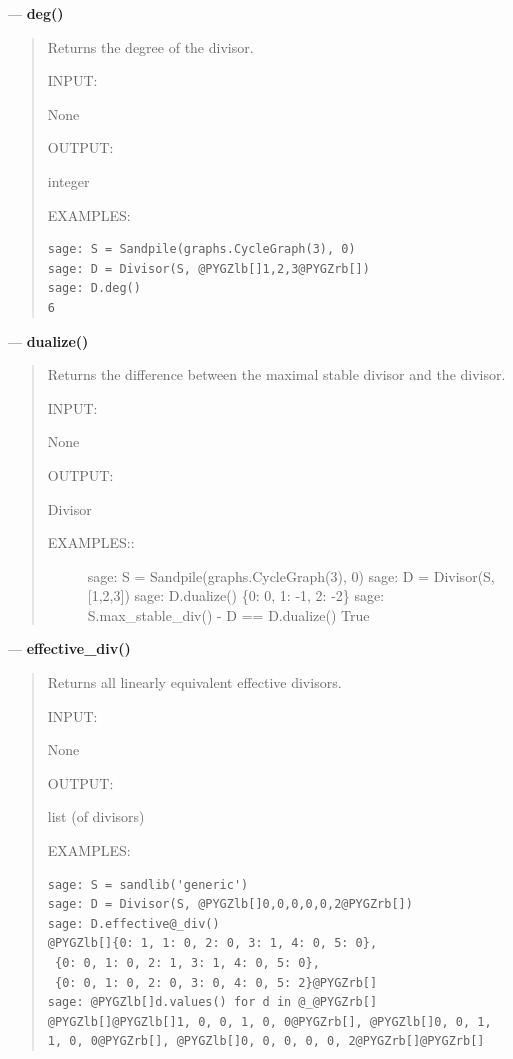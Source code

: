 \documentclass[letterpaper,10pt,english]{manual}
\begin{document}
---
\hypertarget{deg-divisor}{}
\textbf{deg()}
\begin{quote}

Returns the degree of the divisor.

INPUT:

None

OUTPUT:

integer

EXAMPLES:

\begin{Verbatim}[commandchars=@\[\]]
sage: S = Sandpile(graphs.CycleGraph(3), 0)
sage: D = Divisor(S, @PYGZlb[]1,2,3@PYGZrb[])
sage: D.deg()
6
\end{Verbatim}
\end{quote}

---
\hypertarget{dualize-divisor}{}
\textbf{dualize()}
\begin{quote}

Returns the difference between the maximal stable divisor and the
divisor.

INPUT:

None

OUTPUT:

Divisor
\begin{description}
\item[EXAMPLES::]
sage: S = Sandpile(graphs.CycleGraph(3), 0)
sage: D = Divisor(S, {[}1,2,3{]})
sage: D.dualize()
\{0: 0, 1: -1, 2: -2\}
sage: S.max\_stable\_div() - D == D.dualize()
True

\end{description}
\end{quote}

---
\hypertarget{effective-div}{}
\textbf{effective\_div()}
\begin{quote}

Returns all linearly equivalent effective divisors.

INPUT:

None

OUTPUT:

list (of divisors)

EXAMPLES:

\begin{Verbatim}[commandchars=@\[\]]
sage: S = sandlib('generic')
sage: D = Divisor(S, @PYGZlb[]0,0,0,0,0,2@PYGZrb[])
sage: D.effective@_div()
@PYGZlb[]{0: 1, 1: 0, 2: 0, 3: 1, 4: 0, 5: 0},
 {0: 0, 1: 0, 2: 1, 3: 1, 4: 0, 5: 0},
 {0: 0, 1: 0, 2: 0, 3: 0, 4: 0, 5: 2}@PYGZrb[]
sage: @PYGZlb[]d.values() for d in @_@PYGZrb[]
@PYGZlb[]@PYGZlb[]1, 0, 0, 1, 0, 0@PYGZrb[], @PYGZlb[]0, 0, 1, 1, 0, 0@PYGZrb[], @PYGZlb[]0, 0, 0, 0, 0, 2@PYGZrb[]@PYGZrb[]
\end{Verbatim}
\end{quote}
\end{document}
